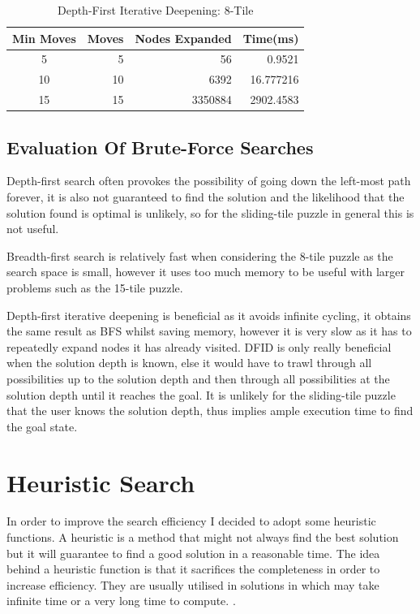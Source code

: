 \documentclass[final]{cmpreport}
\begin{document}
\begin{table}[ht]
	\caption{Depth-First Iterative Deepening: 8-Tile}
	\begin{center}
		\begin{tabular}{crrr} \hline
			Min Moves & Moves & Nodes Expanded &Time(ms)  \\ \hline
			5  & 5 & 56 & 0.9521 \\
			10 & 10  &6392&  16.777216 \\ 
			15 & 15 & 3350884& 2902.4583  \\ \hline
		
		\end{tabular}
	\end{center}
\end{table}



\subsection{Evaluation Of Brute-Force Searches}
Depth-first search often provokes the possibility of going down the left-most path forever, it is also not guaranteed to find the solution and the likelihood that the solution found is optimal is unlikely, so for the sliding-tile puzzle in general this is not useful. 

Breadth-first search is relatively fast when considering the 8-tile puzzle as the search space is small, however it uses too much memory to be useful with larger problems such as the 15-tile puzzle. 

Depth-first iterative deepening is beneficial as it avoids infinite cycling, it obtains the same result as BFS whilst saving memory, however it is very slow as it has to repeatedly expand nodes it has already visited. DFID is only really beneficial when the solution depth is known, else it would have to trawl through all possibilities up to the solution depth and then through all possibilities at the solution depth until it reaches the goal. It is unlikely for the sliding-tile puzzle that the user knows the solution depth, thus implies ample execution time to find the goal state.


\section{Heuristic Search} \label{sec1}
In order to improve the search efficiency I decided to adopt some heuristic functions. A heuristic is a method that might not always find the best solution but it will guarantee to find a good solution in a reasonable time. The idea behind a heuristic function is that it sacrifices the completeness in order to increase efficiency. They are usually utilised in solutions in which may take infinite time or a very long time to compute. \citep{DBLP:conf/ai/2014}. 
\end{document}
